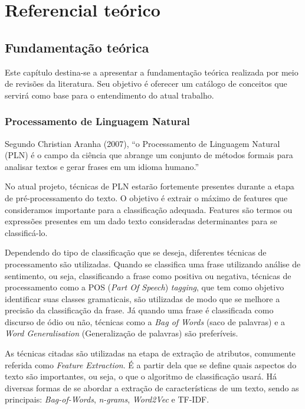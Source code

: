 \part{Referencial teórico}

\chapter[Fundamentação teórica]{Fundamentação teórica}

Este capítulo destina-se a apresentar a fundamentação teórica realizada por meio de revisões da literatura. Seu objetivo é oferecer um catálogo de conceitos que servirá como base para o entendimento do atual trabalho.

\section[Processamento de Linguagem	 Natural]{Processamento de Linguagem Natural}

Segundo Christian Aranha (2007), “o Processamento de Linguagem Natural (PLN) é o campo da ciência que abrange um conjunto de métodos formais para analisar textos e gerar frases em um idioma humano.”

No atual projeto, técnicas de PLN estarão fortemente presentes durante a etapa de pré-processamento do texto. O objetivo é extrair o máximo de features que consideramos importante para a classificação adequada. Features são termos ou expressões presentes em um dado texto consideradas determinantes para se classificá-lo.

Dependendo do tipo de classificação que se deseja, diferentes técnicas de processamento são utilizadas. Quando se classifica uma frase utilizando análise de sentimento, ou seja, classificando a frase como positiva ou negativa, técnicas de processamento como a POS (\textit{Part Of Speech}) \textit{tagging}, que tem como objetivo identificar suas classes gramaticais, são utilizadas de modo que se melhore a precisão da classificação da frase. Já quando uma frase é classificada como discurso de ódio ou não, técnicas como a \textit{Bag of Words} (saco de palavras) e a \textit{Word Generalisation} (Generalização de palavras) são preferíveis.

As técnicas citadas são utilizadas na etapa de extração de atributos, comumente referida como \textit{Feature Extraction}. É a partir dela que se define quais aspectos do texto são importantes, ou seja, o que o algoritmo de classificação usará. Há diversas formas de se abordar a extração de características de um texto, sendo as principais: \textit{Bag-of-Words}, \textit{n-grams}, \textit{Word2Vec} e TF-IDF.

